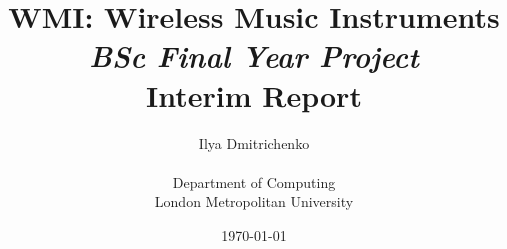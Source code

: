 

\newcommand{\Chip}[1]{\emph{\texttt{#1}}}
\newcommand{\MCX}[0]{\Chip{MC1322x}}
\newcommand{\RFA}[0]{\Chip{ATmega128RFA1}}
\newcommand{\Port}[1]{\emph{\texttt{Port #1}}}
\newcommand{\Comp}[1]{\emph{\texttt{#1}}}
\newcommand{\WPAN}[0]{\emph{LR-WPAN}}
\newcommand{\Tracker}[0]{\subsubsection{\emph{Tracked Issues}}\begin{description}}

\newcommand{\Issue}[1]{\href{http://wmi.new-synth.info/issues/#1}{Issue \##1}}

\newcommand{\IssueX}[1]{\item[\href{http://wmi.new-synth.info/issues/#1}{\Issue{#1}}]:}

\newcommand{\TEP}[1]{\emph{\href{http://www.tinyos.net/tinyos-2.x/doc/pdf/tep#1.pdf}{TEP#1}}}

\newcommand{\Contiki}[0]{\emph{Contiki}}
\newcommand{\ContikiOS}[0]{\emph{Contiki OS}}
\newcommand{\TinyOS}[0]{\emph{TinyOS}}


\documentclass[a4paper]{report}

\usepackage{multirow}
\usepackage{graphicx}

\usepackage{hyperref} \newcommand{\URL}[1]{\[ \href{#1}{\texttt{\emph{#1}}} \]}




\title{WMI: Wireless Music Instruments\\ \emph{BSc Final Year Project} \\ Interim Report}
\author{Ilya Dmitrichenko \\ \\ Department of Computing\\ London Metropolitan University}

\date{\today}




